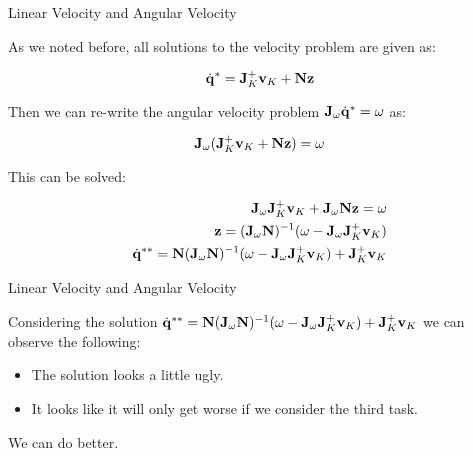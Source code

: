 \documentclass{beamer}
\begin{document}
\begin{frame}{Linear Velocity and Angular Velocity}
	\begin{flushleft}
		
		As we noted before, all solutions to the velocity problem are given as:
		
		\begin{equation}
			\dot{\mathbf{q}}^* = \mathbf{J}_K^+ \mathbf{v}_K + \mathbf{N} \mathbf{z}
		\end{equation}
		
		Then we can re-write the angular velocity problem $\mathbf{J}_\omega \dot{\mathbf{q}}^* = \omega$ as:
		
		\begin{equation}
			\mathbf{J}_\omega (\mathbf{J}_K^+ \mathbf{v}_K + \mathbf{N} \mathbf{z}) = \omega
		\end{equation}		
	
	This can be solved:
	
		\begin{align}
			\mathbf{J}_\omega \mathbf{J}_K^+ \mathbf{v}_K + \mathbf{J}_\omega \mathbf{N} \mathbf{z} = \omega \\
			\mathbf{z} = (\mathbf{J}_\omega\mathbf{N} )^{-1}(\omega - \mathbf{J}_\omega \mathbf{J}_K^+ \mathbf{v}_K) \\
			\dot{\mathbf{q}}^{**} =  \mathbf{N}(\mathbf{J}_\omega\mathbf{N} )^{-1}(\omega - \mathbf{J}_\omega \mathbf{J}_K^+ \mathbf{v}_K) + \mathbf{J}_K^+ \mathbf{v}_K
		\end{align}			
		
	\end{flushleft}
\end{frame}



\begin{frame}{Linear Velocity and Angular Velocity}
	\begin{flushleft}
		
		Considering the solution $\dot{\mathbf{q}}^{**} =  \mathbf{N}(\mathbf{J}_\omega\mathbf{N} )^{-1}(\omega - \mathbf{J}_\omega \mathbf{J}_K^+ \mathbf{v}_K) + \mathbf{J}_K^+ \mathbf{v}_K$ we can observe the following:
		
		\bigskip
		
		\begin{itemize}
			\item The solution looks a little ugly.
			
			\item It looks like it will only get worse if we consider the third task.
		\end{itemize}
	
	\bigskip
	
		We can do better.
		
	\end{flushleft}
\end{frame}
\end{document}
